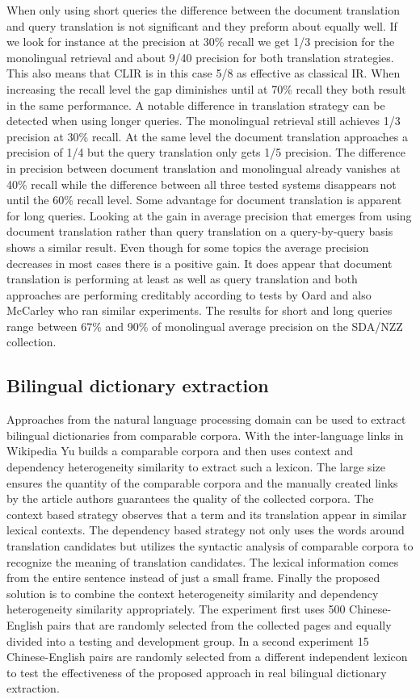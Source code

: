 \documentclass[journal]{IEEEtran}
\begin{document}
When only using short queries the difference between the document translation and query translation is not significant and they preform about equally well.
If we look for instance at the precision at 30\% recall we get 1/3 precision for the monolingual retrieval and about 9/40 precision for both translation strategies.
This also means that CLIR is in this case 5/8 as effective as classical IR.
When increasing the recall level the gap diminishes until at 70\% recall they both result in the same performance.
A notable difference in translation strategy can be detected when using longer queries.
The monolingual retrieval still achieves 1/3 precision at 30\% recall.
At the same level the document translation approaches a precision of 1/4 but the query translation only gets 1/5 precision.
The difference in precision between document translation and monolingual already vanishes at 40\% recall while the difference between all three tested systems disappears not until the 60\% recall level.
Some advantage for document translation is apparent for long queries.
Looking at the gain in average precision that emerges from using document translation rather than query translation on a query-by-query basis shows a similar result.
Even though for some topics the average precision decreases in most cases there is a positive gain.
It does appear that document translation is performing at least as well as query translation and both approaches are performing creditably according to tests by Oard \cite{oard97b} and also McCarley \cite{mccarley99} who ran similar experiments.
The results for short and long queries range between 67\% and 90\% of monolingual average precision on the SDA/NZZ collection.

\subsection{Bilingual dictionary extraction}
Approaches from the natural language processing domain can be used to extract bilingual dictionaries from comparable corpora.
With the inter-language links in Wikipedia Yu \cite{yu09} builds a comparable corpora and then uses context and dependency heterogeneity similarity to extract such a lexicon.
The large size ensures the quantity of the comparable corpora and the manually created links by the article authors guarantees the quality of the collected corpora.
The context based strategy observes that a term and its translation appear in similar lexical contexts.
The dependency based strategy not only uses the words around translation candidates but utilizes the syntactic analysis of comparable corpora to recognize the meaning of translation candidates.
The lexical information comes from the entire sentence instead of just a small frame.
Finally the proposed solution is to combine the context heterogeneity similarity and dependency heterogeneity similarity appropriately.
The experiment first uses 500 Chinese-English pairs that are randomly selected from the collected pages and equally divided into a testing and development group.
In a second experiment 15 Chinese-English pairs are randomly selected from a different independent lexicon to test the effectiveness of the proposed approach in real bilingual dictionary extraction.
\end{document}
